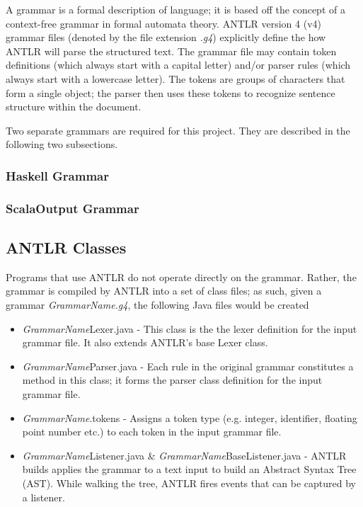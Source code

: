 \documentclass{report}
\begin{document}
A grammar is a formal description of language; it is based off the concept of a context-free grammar in formal automata theory.  ANTLR version 4 (v4) grammar files (denoted by the file extension \emph{.g4}) explicitly define the how ANTLR will parse the structured text.  The grammar file may contain token definitions (which always start with a capital letter) and/or parser rules (which always start with a lowercase letter).  The tokens are groups of characters that form a single object; the parser then uses these tokens to recognize sentence structure within the document.

Two separate grammars are required for this project.  They are described in the following two subsections.

\subsubsection{Haskell Grammar}

\subsubsection{ScalaOutput Grammar}

\subsection{ANTLR Classes}

Programs that use ANTLR do not operate directly on the grammar.  Rather, the grammar is compiled by ANTLR into a set of class files; as such, given a grammar \emph{GrammarName.g4}, the following Java files would be created

\begin{itemize}
	\item \emph{GrammarName}Lexer.java - This class is the the lexer definition for the input grammar file.  It also extends ANTLR's base Lexer class.
	
	\item \emph{GrammarName}Parser.java - Each rule in the original grammar constitutes a method in this class; it forms the parser class definition for the input grammar file.
	
	\item \emph{GrammarName}.tokens - Assigns a token type (e.g. integer, identifier, floating point number etc.) to each token in the input grammar file.
	
	\item \emph{GrammarName}Listener.java \& \emph{GrammarName}BaseListener.java - ANTLR builds applies the grammar to a text input to build an Abstract Syntax Tree (AST).  While walking the tree, ANTLR fires events that can be captured by a listener\cite{antlrDefinitiveReference}.
\end{itemize}
\end{document}
